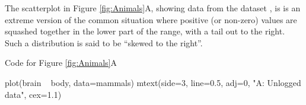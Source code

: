 The scatterplot in Figure \ref{fig:Animals}A, showing data from the
dataset , is is an extreme version of the
common situation where positive (or non-zero) values are squashed
together in the lower part of the range, with a tail out to the right.
Such a distribution is said to be ``skewed to the right''.

Code for Figure \ref{fig:Animals}A
\begin{Schunk}
\begin{Sinput}
plot(brain ~ body, data=mammals)
mtext(side=3, line=0.5, adj=0,
      "A: Unlogged data", cex=1.1)
\end{Sinput}
\end{Schunk}

\begin{marginfigure}
\begin{Schunk}



\end{Schunk}
\end{marginfigure}
